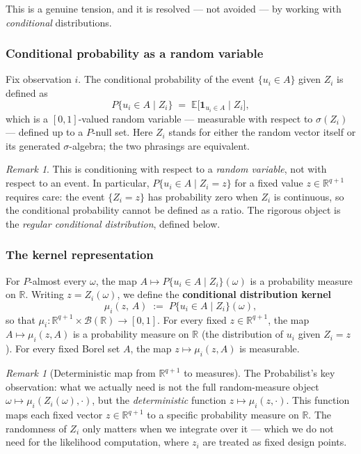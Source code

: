 \documentclass[a4paper,oneside,12pt]{extarticle}
\theoremstyle{plain}
\theoremstyle{definition}
\theoremstyle{remark}
\newtheorem{remark}[proposition]{Remark}
\newcommand*{\E}{\mathbb{E}}
\begin{document}
This is a genuine tension, and it is resolved — not avoided — by
working with \emph{conditional} distributions.

\subsubsection*{Conditional probability as a random variable}

Fix observation $i$.  The conditional probability of the event
$\{u_i \in A\}$ given $Z_i$ is defined as
\[
  P\{u_i \in A \mid Z_i\}
  \;=\;
  \E\bigl[\mathbf{1}_{u_i \in A} \mid Z_i\bigr],
\]
which is a $[0,1]$-valued random variable — measurable with respect
to $\sigma(Z_i)$ — defined up to a $P$-null set.
Here $Z_i$ stands for either the random vector itself or its
generated $\sigma$-algebra; the two phrasings are equivalent.

\begin{remark}
This is conditioning with respect to a \emph{random variable},
not with respect to an event.  In particular,
$P\{u_i \in A \mid Z_i = z\}$ for a fixed value
$z \in \mathbb{R}^{q+1}$ requires care: the event $\{Z_i = z\}$
has probability zero when $Z_i$ is continuous, so the conditional
probability cannot be defined as a ratio.  The rigorous object is
the \emph{regular conditional distribution}, defined below.
\end{remark}

\subsubsection*{The kernel representation}

For $P$-almost every $\omega$, the map $A \mapsto P\{u_i \in A \mid Z_i\}(\omega)$
is a probability measure on $\mathbb{R}$.  Writing $z = Z_i(\omega)$,
we define the \textbf{conditional distribution kernel}
\[
  \mu_i(z,\, A) \;:=\; P\{u_i \in A \mid Z_i\}(\omega),
\]
so that $\mu_i\colon \mathbb{R}^{q+1} \times \mathcal{B}(\mathbb{R})
\to [0,1]$.  For every fixed $z \in \mathbb{R}^{q+1}$, the map
$A \mapsto \mu_i(z, A)$ is a probability measure on $\mathbb{R}$
(the distribution of $u_i$ given $Z_i = z$).  For every fixed
Borel set $A$, the map $z \mapsto \mu_i(z, A)$ is measurable.

\begin{remark}[Deterministic map from $\mathbb{R}^{q+1}$ to measures]
The Probabilist's key observation: what we actually need is not the full
random-measure object $\omega \mapsto \mu_i(Z_i(\omega), \cdot)$,
but the \emph{deterministic} function $z \mapsto \mu_i(z, \cdot)$.
This function maps each fixed vector $z \in \mathbb{R}^{q+1}$ to
a specific probability measure on $\mathbb{R}$.  The randomness of
$Z_i$ only matters when we integrate over it — which we do not need
for the likelihood computation, where $z_i$ are treated as fixed
design points.
\end{remark}
\end{document}
